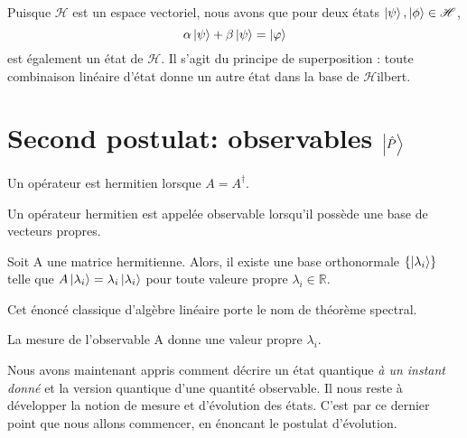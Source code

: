 \documentclass[../notesdecours.tex]{subfiles}
\begin{document}
    \begin{property}
        Puisque $\mathcal{H}$ est un espace vectoriel, nous avons que pour deux états $\ket{\psi},\ket{\phi} \in\mathcal{H}$, 
        \begin{equation}
            \alpha\ket{\psi}+\beta\ket{\psi}=\ket{\varphi}
        \end{equation}
        est également un état de $\mathcal{H}$. Il s'agit du principe de superposition : toute combinaison linéaire d'état donne un autre état dans la base de $\mathcal{H}$ilbert.
        \label{Superposition}
    \end{property}

    \section{Second postulat: observables $\ket{\hat{P}}$}

    \begin{definition}
        Un opérateur est hermitien lorsque $A=A^\dagger$.
    \end{definition}

    \begin{definition}
        Un opérateur hermitien est appelée observable lorsqu'il possède une base de vecteurs propres.
    \end{definition}

    \begin{theorem}
        Soit A une matrice hermitienne. Alors, il existe une base orthonormale $\{\ket{\lambda_i}\}$ telle que $A\ket{\lambda_i}=\lambda_i\ket{\lambda_i}$ pour toute valeure propre $\lambda_i\in\mathbb{R}$.
    \end{theorem}

    \begin{remark}
        Cet énoncé classique d'algèbre linéaire porte le nom de théorème spectral.
    \end{remark}

    \begin{remark}
        La mesure de l'observable A donne une valeur propre $\lambda_i$.
    \end{remark}

    Nous avons maintenant appris comment décrire un état quantique \textit{à un instant donné} et la version quantique d'une quantité observable. Il nous reste à développer la notion de mesure et d'évolution des états. C'est par ce dernier point que nous allons commencer, en énoncant le postulat d'évolution.
\end{document}
